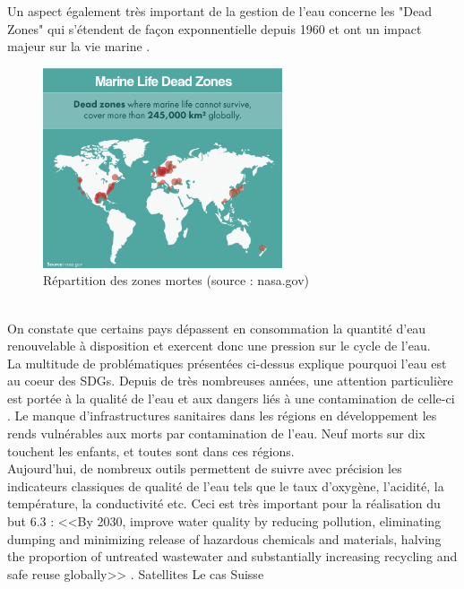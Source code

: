 \documentclass[10pt, conference, compsocconf]{llncs}
\begin{document}
			Un aspect également très important de la gestion de l'eau concerne les "Dead Zones" qui s'étendent de façon exponnentielle depuis 1960 et ont un impact majeur sur la vie marine \cite{diaz_spreading_2008}. \\
			\begin{figure}
				\begin{center}
					\includegraphics[width=200pt]{marine-life-dead-zones.png}
				\end{center}
				\caption{Répartition des zones mortes (source : nasa.gov)}
			\end{figure} \\
			On constate que certains pays dépassent en consommation la quantité d'eau renouvelable à disposition et exercent donc une pression sur le cycle de l'eau. \\
			La multitude de problématiques présentées ci-dessus explique pourquoi l'eau est au coeur des SDGs. Depuis de très nombreuses années, une attention particulière est portée à la qualité de l'eau et aux dangers liés à une contamination de celle-ci \cite{ashbolt_microbial_2004}. Le manque d'infrastructures sanitaires dans les régions en développement les rends vulnérables aux morts par contamination de l'eau. Neuf morts sur dix touchent les enfants, et toutes sont dans ces régions. \\
			Aujourd'hui, de nombreux outils permettent de suivre avec précision les indicateurs classiques de qualité de l'eau tels que le taux d'oxygène, l'acidité, la température, la conductivité etc. Ceci est très important pour la réalisation du but 6.3 : <<By 2030, improve water quality by reducing pollution, eliminating dumping and minimizing release of hazardous chemicals and materials, halving the proportion of untreated wastewater and substantially increasing recycling and safe reuse globally>> \cite{united_nations_goal_nodate-4}. 
			Satellites
			Le cas Suisse
		
\end{document}
